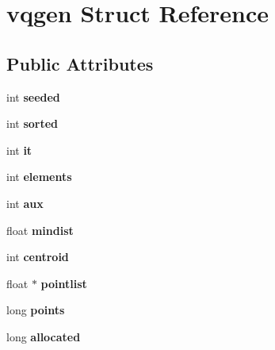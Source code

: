 \hypertarget{structvqgen}{\section{vqgen Struct Reference}
\label{structvqgen}
}
\subsection*{Public Attributes}
\begin{DoxyCompactItemize}
\item 
\hypertarget{structvqgen_a38dc058d04e964502a0bf9720cc65e07}{int {\bfseries seeded}}\label{structvqgen_a38dc058d04e964502a0bf9720cc65e07}

\item 
\hypertarget{structvqgen_a9593a45a916e6dc0d0be9d90560f627a}{int {\bfseries sorted}}\label{structvqgen_a9593a45a916e6dc0d0be9d90560f627a}

\item 
\hypertarget{structvqgen_adb814cb412b03818ad038401926a875e}{int {\bfseries it}}\label{structvqgen_adb814cb412b03818ad038401926a875e}

\item 
\hypertarget{structvqgen_ae9cf105abbc253ea85749b1a3c542967}{int {\bfseries elements}}\label{structvqgen_ae9cf105abbc253ea85749b1a3c542967}

\item 
\hypertarget{structvqgen_a0552a2f8ee4b71b1e5f81b7a9ed04165}{int {\bfseries aux}}\label{structvqgen_a0552a2f8ee4b71b1e5f81b7a9ed04165}

\item 
\hypertarget{structvqgen_aa72b518c7597827d46cadcbf321ae176}{float {\bfseries mindist}}\label{structvqgen_aa72b518c7597827d46cadcbf321ae176}

\item 
\hypertarget{structvqgen_aec939b5c1ed9121f1ac1ecd36ed77c85}{int {\bfseries centroid}}\label{structvqgen_aec939b5c1ed9121f1ac1ecd36ed77c85}

\item 
\hypertarget{structvqgen_ab8f1a19f76873f65c36500d1ddf9a44d}{float $\ast$ {\bfseries pointlist}}\label{structvqgen_ab8f1a19f76873f65c36500d1ddf9a44d}

\item 
\hypertarget{structvqgen_a95e0e94fc47cf59d894937e2a5695fec}{long {\bfseries points}}\label{structvqgen_a95e0e94fc47cf59d894937e2a5695fec}

\item 
\hypertarget{structvqgen_a49b5acee4eece16cf03b84e05e40c748}{long {\bfseries allocated}}\label{structvqgen_a49b5acee4eece16cf03b84e05e40c748}


\end{DoxyCompactItemize}
